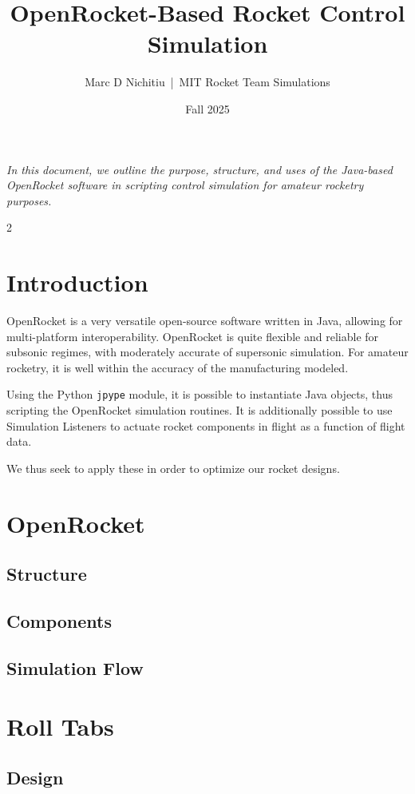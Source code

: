 \documentclass{amsdtx}
\title{\sc OpenRocket-Based Rocket Control Simulation}
\author{\sc Marc D Nichitiu~|~MIT Rocket Team Simulations}
\date{\sc Fall 2025}
\begin{document}
\maketitle    
\begin{center}
	\it In this document, we outline the purpose, structure, and uses of the Java-based OpenRocket software in scripting control simulation for amateur rocketry purposes.
\end{center}
\begin{multicols}{2}
	\tableofcontents
\end{multicols}

\section{Introduction}
OpenRocket is a very versatile open-source software written in Java, allowing for multi-platform interoperability. OpenRocket is quite flexible and reliable for subsonic regimes, with moderately accurate of supersonic simulation. For amateur rocketry, it is well within the accuracy of the manufacturing modeled. 

Using the Python {\tt jpype} module, it is possible to instantiate Java objects, thus scripting the OpenRocket simulation routines. It is additionally possible to use Simulation Listeners to actuate rocket components in flight as a function of flight data.

We thus seek to apply these in order to optimize our rocket designs.
\section{OpenRocket}
\subsection{Structure}
\subsection{Components}
\subsection{Simulation Flow}
\section{Roll Tabs}
\subsection{Design}
\end{document}
